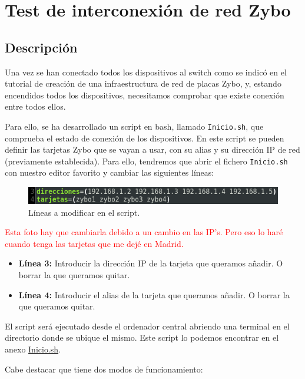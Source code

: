 \section{Test de interconexión de red Zybo}
\hypertarget{TestConexion}{}
\subsection{Descripción}
Una vez se han conectado todos los dispositivos al switch como se indicó en el tutorial de creación de una infraestructura de red de placas Zybo, y, estando encendidos todos los dispositivos, necesitamos comprobar que existe conexión entre todos ellos.

Para ello, se ha desarrollado un script en bash, llamado \texttt{Inicio.sh}, que comprueba el estado de conexión de los dispositivos. En este script se pueden definir las tarjetas Zybo que se vayan a usar, con su alias y su dirección IP de red (previamente establecida). Para ello, tendremos que abrir el fichero \texttt{Inicio.sh} con nuestro editor favorito y cambiar las siguientes líneas:
\begin{figure}[h]
	\centering
	\includegraphics[scale=0.7]{Anexos/Anexo2/Test/Script.png}
	\caption{Líneas a modificar en el script.}
	\label{Líneas a modificar en el script}
\end{figure}

\textcolor{red}{Esta foto hay que cambiarla debido a un cambio en las IP's. Pero eso lo haré cuando tenga las tarjetas que me dejé en Madrid.}
\begin{itemize}
	\item \textbf{Línea 3:} Introducir la dirección IP de la tarjeta que queramos añadir. O borrar la que queramos quitar.
	\item \textbf{Línea 4:} Introducir el alias de la tarjeta que queramos añadir. O borrar la que queramos quitar.
\end{itemize}

El script será ejecutado desde el ordenador central abriendo una terminal en el directorio donde se ubique el mismo. Este script lo podemos encontrar en el anexo \hyperlink{ScriptConexion}{Inicio.sh}.

Cabe destacar que tiene dos modos de funcionamiento:
